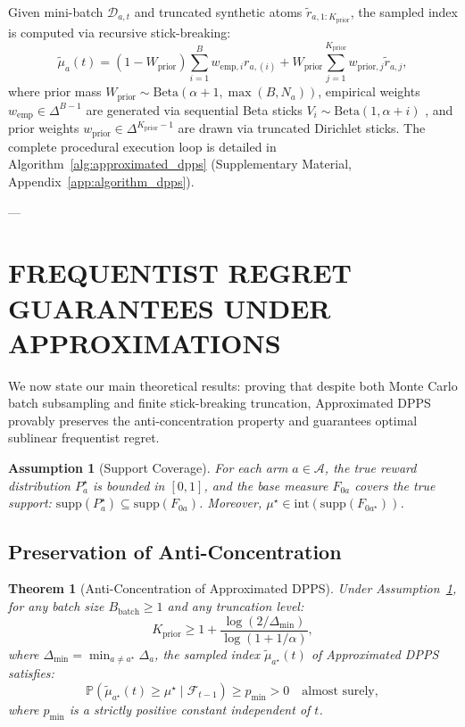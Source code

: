 \documentclass[twoside]{article}
\newtheorem{theorem}{Theorem}
\newtheorem{assumption}{Assumption}
\begin{document}
Given mini-batch $\mathcal{D}_{a, t}$ and truncated synthetic atoms $\tilde{r}_{a, 1:K_{\text{prior}}}$, the sampled index is computed via recursive stick-breaking:
\begin{equation}
\tilde{\mu}_a(t) = (1 - W_{\text{prior}}) \sum_{i=1}^{B} w_{\text{emp}, i} r_{a, (i)} + W_{\text{prior}} \sum_{j=1}^{K_{\text{prior}}} w_{\text{prior}, j} \tilde{r}_{a, j},
\label{eq:dpps_sampling_formula}
\end{equation}
where prior mass $W_{\text{prior}} \sim \text{Beta}(\alpha + 1, \max(B, N_a))$, empirical weights $w_{\text{emp}} \in \Delta^{B-1}$ are generated via sequential Beta sticks $V_i \sim \text{Beta}(1, \alpha + i)$ \citep{vashishtha2025leveraging}, and prior weights $w_{\text{prior}} \in \Delta^{K_{\text{prior}}-1}$ are drawn via truncated Dirichlet sticks. The complete procedural execution loop is detailed in Algorithm~\ref{alg:approximated_dpps} (Supplementary Material, Appendix~\ref{app:algorithm_dpps}).

---

\section{FREQUENTIST REGRET GUARANTEES UNDER APPROXIMATIONS}
\label{sec:theory}

We now state our main theoretical results: proving that despite both Monte Carlo batch subsampling and finite stick-breaking truncation, Approximated DPPS provably preserves the anti-concentration property and guarantees optimal sublinear frequentist regret.

\begin{assumption}[Support Coverage]
\label{ass:support}
For each arm $a \in \mathcal{A}$, the true reward distribution $P^\star_a$ is bounded in $[0, 1]$, and the base measure $F_{0a}$ covers the true support: $\text{supp}(P^\star_a) \subseteq \text{supp}(F_{0a})$. Moreover, $\mu^\star \in \text{int}(\text{supp}(F_{0a^\star}))$.
\end{assumption}

\subsection{Preservation of Anti-Concentration}

\begin{theorem}[Anti-Concentration of Approximated DPPS]
\label{thm:dpps_anti_concentration}
Under Assumption~\ref{ass:support}, for any batch size $B_{\text{batch}} \ge 1$ and any truncation level:
\begin{equation}
K_{\text{prior}} \ge 1 + \frac{\log(2 / \Delta_{\min})}{\log(1 + 1/\alpha)},
\end{equation}
where $\Delta_{\min} = \min_{a \ne a^\star} \Delta_a$, the sampled index $\tilde{\mu}_{a^\star}(t)$ of Approximated DPPS satisfies:
\begin{equation}
\mathbb{P}\left( \tilde{\mu}_{a^\star}(t) \ge \mu^\star \mid \mathcal{F}_{t-1} \right) \ge p_{\min} > 0 \quad \text{almost surely},
\end{equation}
where $p_{\min}$ is a strictly positive constant independent of $t$.
\end{theorem}
\end{document}
